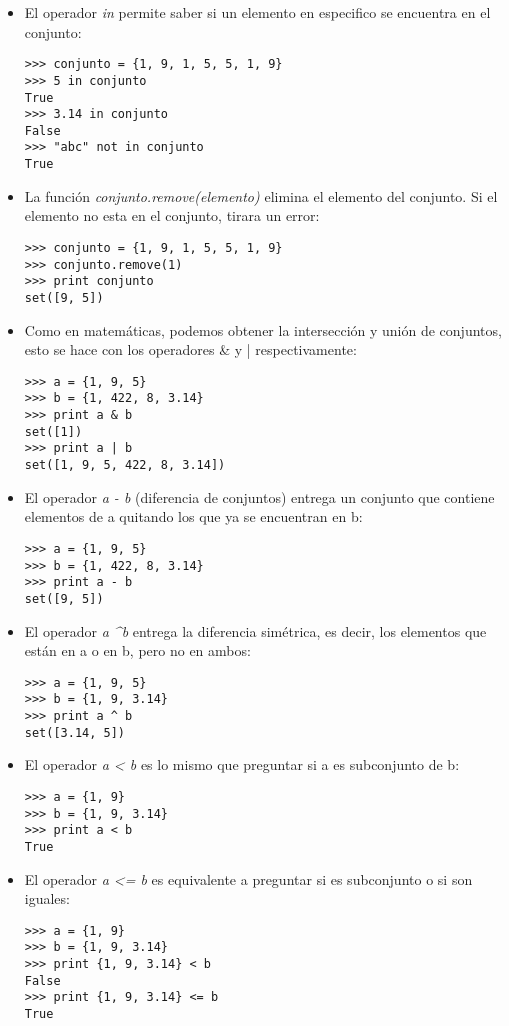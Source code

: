 \begin{itemize}

\item El operador \textit{in} permite saber si un elemento en especifico se encuentra en el conjunto:
\begin{lstlisting}[style=consola]
>>> conjunto = {1, 9, 1, 5, 5, 1, 9}
>>> 5 in conjunto
True
>>> 3.14 in conjunto
False
>>> "abc" not in conjunto
True
\end{lstlisting}

\item La función \textit{conjunto.remove(elemento)} elimina el elemento del conjunto. Si el elemento no esta en el conjunto, tirara un error:
\begin{lstlisting}[style=consola]
>>> conjunto = {1, 9, 1, 5, 5, 1, 9}
>>> conjunto.remove(1)
>>> print conjunto
set([9, 5])
\end{lstlisting}

\item Como en matemáticas, podemos obtener la intersección y unión de conjuntos, esto se hace con los operadores \& y | respectivamente:
\begin{lstlisting}[style=consola]
>>> a = {1, 9, 5}
>>> b = {1, 422, 8, 3.14}
>>> print a & b
set([1])
>>> print a | b
set([1, 9, 5, 422, 8, 3.14])
\end{lstlisting}

\item El operador \textit{a - b} (diferencia de conjuntos) entrega un conjunto que contiene elementos de a quitando los que ya se encuentran en b:
\begin{lstlisting}[style=consola]
>>> a = {1, 9, 5}
>>> b = {1, 422, 8, 3.14}
>>> print a - b
set([9, 5])
\end{lstlisting}

\item El operador \textit{a \textasciicircum b} entrega la diferencia simétrica, es decir, los elementos que están en a o en b, pero no en ambos:
\begin{lstlisting}[style=consola]
>>> a = {1, 9, 5}
>>> b = {1, 9, 3.14}
>>> print a ^ b
set([3.14, 5])
\end{lstlisting}

\item El operador \textit{a < b} es lo mismo que preguntar si a es subconjunto de b:
\begin{lstlisting}[style=consola]
>>> a = {1, 9}
>>> b = {1, 9, 3.14}
>>> print a < b
True
\end{lstlisting}

\item El operador \textit{a <= b} es equivalente a preguntar si es subconjunto o si son iguales:
\begin{lstlisting}[style=consola]
>>> a = {1, 9}
>>> b = {1, 9, 3.14}
>>> print {1, 9, 3.14} < b
False
>>> print {1, 9, 3.14} <= b
True
\end{lstlisting}

\end{itemize}

\newpage
